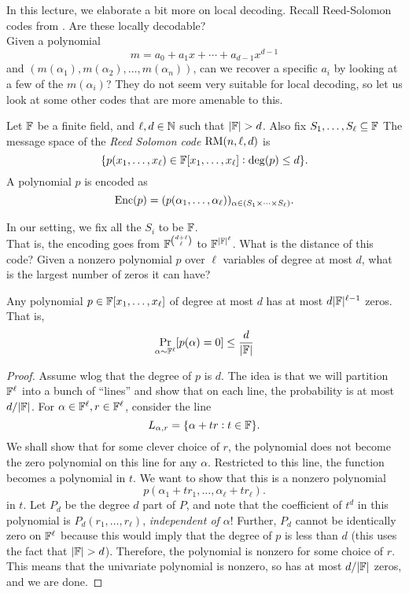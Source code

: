 		In this lecture, we elaborate a bit more on local decoding. Recall Reed-Solomon codes from . Are these locally decodable?\\
		Given a polynomial
		\[ m = a_0 + a_1x + \cdots + a_{d-1}x^{d-1} \]
		and $(m(\alpha_1),m(\alpha_2),\ldots,m(\alpha_n))$, can we recover a specific $a_i$ by looking at a few of the $m(\alpha_i)$? They do not seem very suitable for local decoding, so let us look at some other codes that are more amenable to this.

		\begin{fdef}
			Let $\mathbb{F}$ be a finite field, and $\ell,d \in \mathbb{N}$ such that $|\mathbb{F}| > d$. Also fix $S_1,\ldots,S_\ell \subseteq \mathbb{F}$ The message space of the \emph{Reed Solomon code} $\operatorname{RM}(n,\ell,d)$ is
			\[ \{ p(x_1,\ldots,x_\ell) \in \mathbb{F}[x_1,\ldots,x_\ell] : \deg(p) \le d \}. \]
			A polynomial $p$ is encoded as
			\[ \operatorname{Enc}(p) = (p(\alpha_1,\ldots,\alpha_\ell))_{\alpha \in (S_1 \times \cdots \times S_\ell)}. \]
		\end{fdef}

		In our setting, we fix all the $S_i$ to be $\mathbb{F}$.\\
		That is, the encoding goes from $\mathbb{F}^{\binom{d+\ell}{\ell}}$ to $\mathbb{F}^{|\mathbb{F}|^\ell}$. What is the distance of this code? Given a nonzero polynomial $p$ over $\ell$ variables of degree at most $d$, what is the largest number of zeros it can have?

		\begin{fprop}
			Any polynomial $p \in \mathbb{F}[x_1,\ldots,x_\ell]$ of degree at most $d$ has at most $d |\mathbb{F}|^{\ell-1}$ zeros. That is,
			\[ \Pr_{\alpha \sim \mathbb{F}^\ell} [p(\alpha) = 0] \le \frac{d}{|\mathbb{F}|} \]
		\end{fprop}
		\begin{proof}
			Assume wlog that the degree of $p$ is $d$. The idea is that we will partition $\mathbb{F}^\ell$ into a bunch of ``lines'' and show that on each line, the probability is at most $d/|\mathbb{F}|$. For $\alpha \in \mathbb{F}^\ell, r \in \mathbb{F}^\ell$, consider the line
			\[ L_{\alpha,r} = \{ \alpha + tr : t \in \mathbb{F} \}. \]
			We shall show that for some clever choice of $r$, the polynomial does not become the zero polynomial on this line for any $\alpha$. Restricted to this line, the function becomes a polynomial in $t$. We want to show that this is a nonzero polynomial
			\[ p(\alpha_1 + tr_1,\ldots,\alpha_\ell + tr_\ell). \]
			in $t$. Let $P_d$ be the degree $d$ part of $P$, and note that the coefficient of $t^d$ in this polynomial is $P_d(r_1,\ldots,r_\ell)$, \emph{independent of $\alpha$}! Further, $P_d$ cannot be identically zero on $\mathbb{F}^\ell$ because this would imply that the degree of $p$ is less than $d$ (this uses the fact that $|\mathbb{F}| > d$). Therefore, the polynomial is nonzero for some choice of $r$. This means that the univariate polynomial is nonzero, so has at most $d/|\mathbb{F}|$ zeros, and we are done.
		\end{proof}

